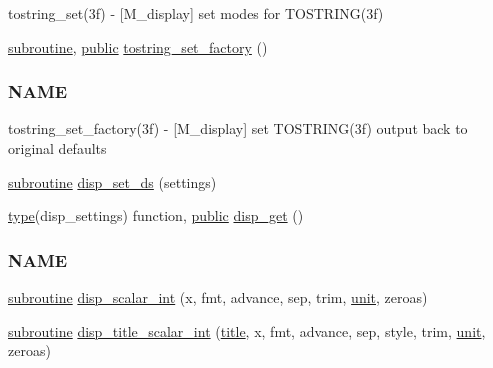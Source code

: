 \begin{DoxyCompactItemize}
\begin{DoxyCompactList}
tostring\+\_\+set(3f) -\/ \mbox{[}M\+\_\+display\mbox{]} set modes for T\+O\+S\+T\+R\+I\+N\+G(3f) \end{DoxyCompactList}\item 
\hyperlink{M__stopwatch_83_8txt_acfbcff50169d691ff02d4a123ed70482}{subroutine}, \hyperlink{M__stopwatch_83_8txt_a2f74811300c361e53b430611a7d1769f}{public} \hyperlink{namespacem__display_abf51a5db397d27e0c6cb39e9f3fa7e24}{tostring\+\_\+set\+\_\+factory} ()
\begin{DoxyCompactList}\small\item\em \subsubsection*{N\+A\+ME}

tostring\+\_\+set\+\_\+factory(3f) -\/ \mbox{[}M\+\_\+display\mbox{]} set T\+O\+S\+T\+R\+I\+N\+G(3f) output back to original defaults \end{DoxyCompactList}\item 
\hyperlink{M__stopwatch_83_8txt_acfbcff50169d691ff02d4a123ed70482}{subroutine} \hyperlink{namespacem__display_a6296917336a62e43005e56c48340eaf1}{disp\+\_\+set\+\_\+ds} (settings)
\item 
\hyperlink{stop__watch_83_8txt_a70f0ead91c32e25323c03265aa302c1c}{type}(disp\+\_\+settings) function, \hyperlink{M__stopwatch_83_8txt_a2f74811300c361e53b430611a7d1769f}{public} \hyperlink{namespacem__display_a6a49f987c37a95e67744950ecee69530}{disp\+\_\+get} ()
\begin{DoxyCompactList}\small\item\em \subsubsection*{N\+A\+ME}\end{DoxyCompactList}\item 
\hyperlink{M__stopwatch_83_8txt_acfbcff50169d691ff02d4a123ed70482}{subroutine} \hyperlink{namespacem__display_adddf4774edf1fedf5b1f02f47fbbc82f}{disp\+\_\+scalar\+\_\+int} (x, fmt, advance, sep, trim, \hyperlink{M__stopwatch_83_8txt_a5cbef30eb7c0d734bd82f5a7ebea9aa7}{unit}, zeroas)
\item 
\hyperlink{M__stopwatch_83_8txt_acfbcff50169d691ff02d4a123ed70482}{subroutine} \hyperlink{namespacem__display_afaae34a88f7f2d5799469f0a6214e0b2}{disp\+\_\+title\+\_\+scalar\+\_\+int} (\hyperlink{print__watch_83_8txt_a15b5bd21156bb9fca6a755ab8c029a9c}{title}, x, fmt, advance, sep, style, trim, \hyperlink{M__stopwatch_83_8txt_a5cbef30eb7c0d734bd82f5a7ebea9aa7}{unit}, zeroas)

\end{DoxyCompactItemize}
